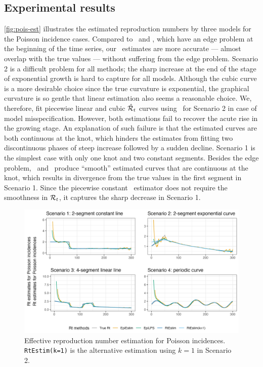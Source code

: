 \subsection{Experimental results}

\autoref{fig:pois-est} illustrates the estimated reproduction numbers by three models for the Poisson incidence cases. Compared to \EpiEstim\ and \EpiLPS, which have an edge problem at the beginning of the time series, our \RtEstim\ estimates are more accurate --- almost overlap with the true values --- without suffering from the edge problem. Scenario 2 is a difficult problem for all methods; the sharp increase at the end of the stage of exponential growth is hard to capture for all models. Although the cubic curve is a more desirable choice since the true curvature is exponential, the graphical curvature is so gentle that linear estimation also seems a reasonable choice. We, therefore, fit piecewise linear and cubic $\hat{\mathcal{R}}_t$ curves using \RtEstim\ for Scenario 2 in case of model misspecification. However, both estimations fail to recover the acute rise in the growing stage. An explanation of such failure is that the estimated curves are both continuous at the knot, which hinders the estimates from fitting two discontinuous phases of steep increase followed by a sudden decline. 
Scenario 1 is the simplest case with only one knot and two constant segments.
Besides the edge problem, \EpiEstim\ and \EpiLPS\ produce ``smooth'' estimated
curves that are continuous at the knot, which results in divergence from the
true values in the first segment in Scenario 1. Since the piecewise constant
\RtEstim\ estimator does not require the smoothness in $\mathcal{R}_t$, it captures
the sharp decrease in Scenario 1. 

\begin{figure}[tb]
    \centering
    \includegraphics[width=.9\textwidth]{fig/Pois-res-plot.png}
    \caption{Effective reproduction number estimation for Poisson incidences. \texttt{RtEstim(k=1)} is the alternative estimation using $k=1$ in Scenario 2.}
    \label{fig:pois-est}
\end{figure}


